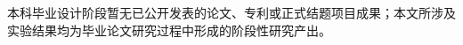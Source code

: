 
\begin{achievements}

\begin{theachievements}[攻读学位期间成果]
  \item 本科毕业设计阶段暂无已公开发表的论文、专利或正式结题项目成果；本文所涉及实验结果均为毕业论文研究过程中形成的阶段性研究产出。
\end{theachievements}

\end{achievements}
